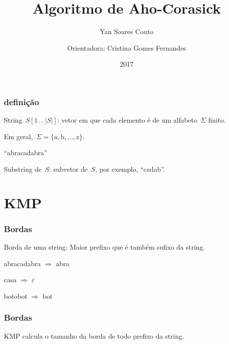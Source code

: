 \documentclass[10pt, compress]{beamer}
\title{Algoritmo de Aho-Corasick}
\subtitle{Yan Soares Couto}
\date{2017}
\author{Orientadora: Cristina Gomes Fernandes}
\institute{Instituto de Matemática e Estatística}
\newcommand{\tdots}{\,.\,.\,} %
\newcommand{\E}{\Sigma}
\begin{document}
\maketitle

\begin{frame}[fragile]
  \frametitle{definição}

String~$S[1\tdots|S|]$: vetor em que cada elemento é de um alfabeto~$\E$ finito.

Em geral,~$\E = \{\text{a}, \text{b}, \ldots, \text{z}\}$.

\pause
\begin{center}
{\huge ``abracadabra''}
\end{center}

Substring de~$S$: subvetor de~$S$, por exemplo, {\large``cadab''}.

\end{frame}

\section{KMP}

\begin{frame}[fragile]
\frametitle{Bordas}

Borda de uma string: Maior prefixo que é também sufixo da string.
\pause

\vfill
\begin{center}
{\large abracadabra} $\Rightarrow$ {\large abra}

{\large casa} $\Rightarrow$ {\large $\varepsilon$}

{\large botobot} $\Rightarrow$ {\large bot}
\end{center}
\vfill

\end{frame}

\begin{frame}[fragile]
\frametitle{Bordas}
KMP calcula o tamanho da borda de todo prefixo da string.

\begin{center}
\end{center}

\end{frame}
\end{document}
